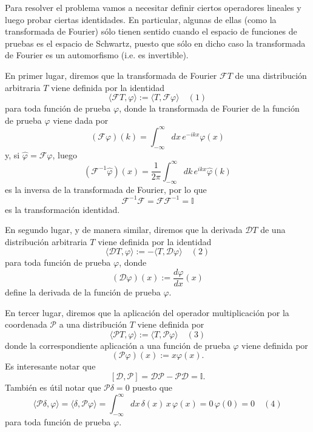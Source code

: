 \documentclass[11pt,spanish]{article}
\newcommand{\four}{\mathcal{F}}
\newcommand{\powr}{\mathcal{P}}
\newcommand{\derv}{\mathcal{D}}
\newcommand{\II}{\mathbb{I}}
\newcounter{problema}
\begin{document}
Para resolver el problema vamos a necesitar definir ciertos operadores lineales y luego probar ciertas identidades.
En particular, algunas de ellas (como la transformada de Fourier) s\'olo tienen sentido cuando el espacio de funciones de pruebas es el espacio de Schwartz, puesto que s\'olo en dicho caso la transformada de Fourier es un automorfismo (i.e. es invertible).

En primer lugar, diremos que la transformada de Fourier  $\four T$ de una distribuci\'on arbitraria $T$ viene definida por la identidad
$$
\langle \four T,\varphi \rangle
:=
\langle T,\four \varphi \rangle
\quad (1)
$$
para toda funci\'on de prueba $\varphi$, donde la transformada de Fourier de la funci\'on de prueba $\varphi$ viene dada por
$$
(\four \varphi)(k)
=
\int_{-\infty}^{\infty}
dx\,
e^{-ikx}
\varphi(x)
$$ 
y, si $\hat{\varphi} = \four \varphi$, luego
$$
(\four^{-1} \hat \varphi)(x)
=
\frac{1}{2\pi}
\int_{-\infty}^{\infty}
dk\,
e^{ikx}
\hat \varphi(k)
$$ 
es la inversa de la transformada de Fourier, por lo que
$$
\four^{-1} \four = \four \four^{-1} = \II
$$
es la transformaci\'on identidad.

En segundo lugar, y de manera similar, diremos que la derivada $\derv T$ de una distribuci\'on arbitraria $T$ viene definida por la identidad
$$
\langle \derv T,\varphi \rangle
:=
-
\langle T,\derv \varphi \rangle
\quad (2)
$$
para toda funci\'on de prueba $\varphi$, donde 
$$
(\derv \varphi)(x)
:=
\frac{d \varphi}{d x}(x)
$$
define la derivada de la funci\'on de prueba $\varphi$.

En tercer lugar, diremos que la aplicaci\'on del operador multiplicaci\'on por la coordenada $\powr$ a una distribuci\'on $T$ viene definida por
$$
\langle \powr T,\varphi \rangle
:=
\langle T,\powr \varphi \rangle
\quad (3)
$$
donde la correspondiente aplicaci\'on a una funci\'on de prueba $\varphi$ viene definida por
$$
(\powr \varphi)(x) := x\varphi(x).
$$
Es interesante notar que
$$
[\derv,\powr] = \derv\powr - \powr\derv = \II.
$$
Tambi\'en es \'util notar que $\powr\delta = 0$ puesto que
$$
\langle \powr \delta, \varphi \rangle
=
\langle \delta, \powr \varphi \rangle
=
\int_{-\infty}^{\infty}
dx\,
\delta(x)\,
x\,
\varphi(x)
=
0\,\varphi(0) = 0
\quad (4)
$$
para toda funci\'on de prueba $\varphi$.
\end{document}
